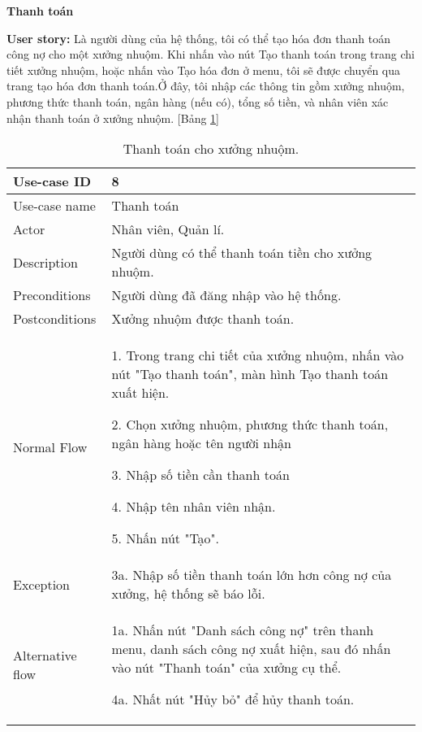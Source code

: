 \textbf{Thanh toán}\par
\textbf{User story:} Là người dùng của hệ thống, tôi có thể tạo hóa đơn thanh toán công nợ cho một xưởng nhuộm. Khi nhấn vào nút Tạo thanh toán trong trang chi tiết xưởng nhuộm, hoặc nhấn vào Tạo hóa đơn ở menu, tôi sẽ được chuyển qua trang tạo hóa đơn thanh toán.Ở đây, tôi nhập các thông tin gồm xưởng nhuộm, phương thức thanh toán, ngân hàng (nếu có), tổng số tiền, và nhân viên xác nhận thanh toán ở xưởng nhuộm. [Bảng \ref{bang5}]
\begin{table}[H]
    \centering
    \begin{tabular}{|m{3cm}|m{10cm}|}
    \hline 
        Use-case ID & 8\\ \hline
        Use-case name & Thanh toán\\ \hline
        Actor & Nhân viên, Quản lí.\\ \hline
        Description & Người dùng có thể thanh toán tiền cho xưởng nhuộm.\\ \hline
        Preconditions & Người dùng đã đăng nhập vào hệ thống.\\ \hline
        Postconditions & Xưởng nhuộm được thanh toán.\\ \hline
        Normal Flow & 
        1. Trong trang chi tiết của xưởng nhuộm, nhấn vào nút "Tạo thanh toán", màn hình Tạo thanh toán xuất hiện.\par
        2. Chọn xưởng nhuộm, phương thức thanh toán, ngân hàng hoặc tên người nhận\par
        3. Nhập số tiền cần thanh toán\par
        4. Nhập tên nhân viên nhận.\par
        5. Nhấn nút "Tạo".
        \\ \hline
        Exception & 
        3a. Nhập số tiền thanh toán lớn hơn công nợ của xưởng, hệ thống sẽ báo lỗi.
        \\ \hline
        Alternative flow & 
        1a. Nhấn nút "Danh sách công nợ" trên thanh menu, danh sách công nợ xuất hiện, sau đó nhấn vào nút "Thanh toán" của xưởng cụ thể.\par
        4a. Nhất nút "Hủy bỏ" để hủy thanh toán.
        \\ 
    \hline 
    \end{tabular}
    \caption{Thanh toán cho xưởng nhuộm.}
    \label{bang5}
\end{table}


